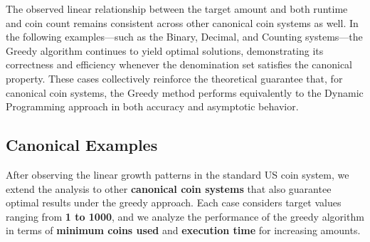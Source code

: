 \documentclass[12pt,a4paper]{report}
\begin{document}
The observed linear relationship between the target amount and both runtime and coin count remains consistent across other canonical coin systems as well. In the following examples—such as the Binary, Decimal, and Counting systems—the Greedy algorithm continues to yield optimal solutions, demonstrating its correctness and efficiency whenever the denomination set satisfies the canonical property. These cases collectively reinforce the theoretical guarantee that, for canonical coin systems, the Greedy method performs equivalently to the Dynamic Programming approach in both accuracy and asymptotic behavior.\\

\subsection{Canonical Examples}
After observing the linear growth patterns in the standard US coin system, we extend the analysis to other \textbf{canonical coin systems} that also guarantee optimal results under the greedy approach. Each case considers target values ranging from \textbf{1 to 1000}, and we analyze the performance of the greedy algorithm in terms of \textbf{minimum coins used} and \textbf{execution time} for increasing amounts.\\
\end{document}
